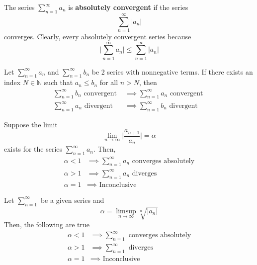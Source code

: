 \documentclass{article}
\begin{document}
      \begin{definition}
        The series $\sum_{n=1}^\infty a_n$ is \textbf{absolutely convergent} if the series 
        \[\sum_{n=1}^\infty |a_n|\]
        converges. Clearly, every absolutely convergent series because 
        \[\bigg|\sum_{n=1}^\infty a_n \bigg| \leq \sum_{n=1}^\infty |a_n|\]
      \end{definition}

      \begin{theorem}
      Let $\sum_{n=1}^\infty a_n$ and $\sum_{n=1}^\infty b_n$ be 2 series with nonnegative terms. If there exists an index $N \in \mathbb{N}$ such that $a_n \leq b_n$ for all $n >N$, then 
      \begin{align*}
          \sum_{n=1}^\infty b_n \text{ convergent } & \implies \sum_{n=1}^\infty a_n \text{ convergent } \\
          \sum_{n=1}^\infty a_n \text{ divergent } & \implies \sum_{n=1}^\infty b_n \text{ divergent }
      \end{align*}
      \end{theorem}

      \begin{theorem}
      Suppose the limit 
      \[\lim_{n\rightarrow \infty} \bigg| \frac{a_{n+1}}{a_n} \bigg| = \alpha\]
      exists for the series $\sum_{n=1}^\infty a_n$. Then, 
      \begin{align*}
          \alpha < 1 & \implies \sum_{n=1}^\infty a_n \text{ converges absolutely} \\
          \alpha > 1 & \implies \sum_{n=1}^\infty a_n \text{ diverges} \\
          \alpha = 1 & \implies \text{ Inconclusive}
      \end{align*}
      \end{theorem}

      \begin{theorem}
      Let $\sum_{n=1}^\infty$ be a given series and 
      \[\alpha = \limsup_{n\rightarrow \infty} \sqrt[n]{|a_n|}\]
      Then, the following are true
      \begin{align*}
          \alpha < 1 & \implies \sum_{n=1}^\infty \text{ converges absolutely} \\
          \alpha > 1 & \implies \sum_{n=1}^\infty \text{ diverges} \\
          \alpha = 1 & \implies \text{ Inconclusive} 
      \end{align*}
      \end{theorem}
\end{document}
